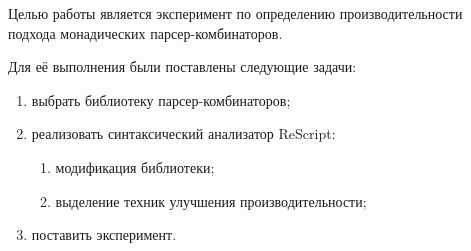 Целью работы является эксперимент по определению производительности подхода
монадических парсер-комбинаторов.

Для её выполнения были поставлены следующие задачи:
\begin{enumerate}
    \item выбрать библиотеку парсер-комбинаторов;
    \item реализовать синтаксический анализатор ReScript:
        \begin{enumerate}
            \item модификация библиотеки;
            \item выделение техник улучшения производительности;
        \end{enumerate}
    \item поставить эксперимент.
\end{enumerate}
